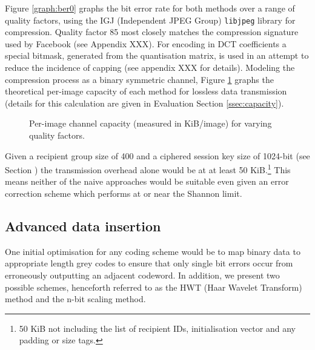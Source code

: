 Figure \ref{graph:ber0} graphs the bit error rate for both methods over a range of quality factors, using the IGJ (Independent JPEG Group) {\tt libjpeg} library for compression. Quality factor 85 most closely matches the compression signature used by Facebook (see Appendix XXX). For encoding in DCT coefficients a special bitmask, generated from the quantisation matrix, is used in an attempt to reduce the incidence of capping (see appendix XXX for details). Modeling the compression process as a binary symmetric channel, Figure \ref{graph:capacity0} graphs the theoretical per-image capacity of each method for lossless data transmission (details for this calculation are given in Evaluation Section \ref{ssec:capacity}).


\begin{figure}[tbph]
  \begin{center}
    \caption{Per-image channel capacity (measured in KiB/image) for varying quality factors.}
    \label{graph:capacity0}
  \end{center}
\end{figure}

Given a recipient group size of 400 and a ciphered session key size of 1024-bit (see Section \label{ssec:keys}) the transmission overhead alone would be at at least 50 KiB.\footnote{50 KiB not including the list of recipient IDs, initialisation vector and any padding or size tags.} This means neither of the naive approaches would be suitable even given an error correction scheme which performs at or near the Shannon limit. 


\subsection{Advanced data insertion}

One initial optimisation for any coding scheme would be to map binary data to appropriate length grey codes to ensure that only single bit errors occur from erroneously outputting an adjacent codeword. In addition, we present two possible schemes, henceforth referred to as the HWT (Haar Wavelet Transform) method and the n-bit scaling method.


